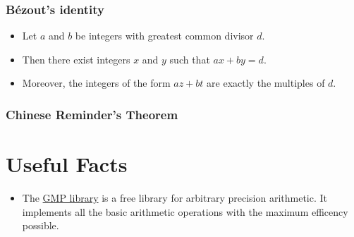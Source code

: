 \documentclass[12pt, a4paper, english]{report}
\begin{document}
\subsection{Bézout's identity}
 \begin{itemize}
     \item Let $a$ and $b$ be integers with greatest common divisor $d$.
     \item Then there exist integers $x$ and $y$ such that $ax + by = d$.
     \item Moreover, the integers of the form $az + bt$ are exactly the multiples of $d$.
 \end{itemize}

\subsection{Chinese Reminder's Theorem}

\chapter*{Useful Facts}
\begin{itemize}
    \item The \href{https://gmplib.org/}{GMP library} is a free library for arbitrary precision arithmetic. It implements all the basic arithmetic operations with the maximum efficency possible.
\end{itemize}

\listofalgorithms
\end{document}
